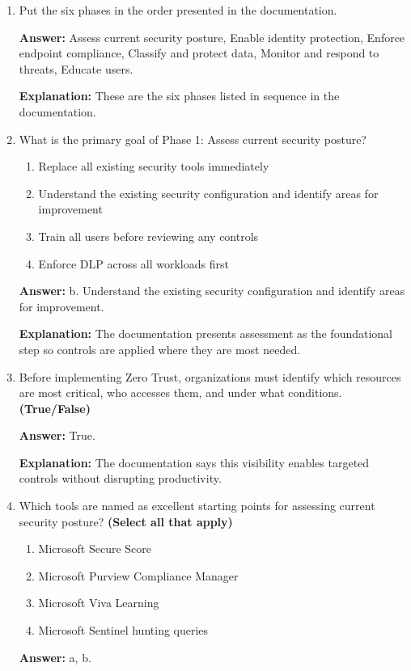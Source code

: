 \documentclass[10pt]{article}
\begin{document}
\begin{enumerate}[leftmargin=*]
\textbf{Explanation:} The documentation says organizations should progress through six phases.

\item Put the six phases in the order presented in the documentation.

\textbf{Answer:} Assess current security posture, Enable identity protection, Enforce endpoint compliance, Classify and protect data, Monitor and respond to threats, Educate users.

\textbf{Explanation:} These are the six phases listed in sequence in the documentation.

\item What is the primary goal of Phase 1: Assess current security posture?
\begin{enumerate}[label=\alph*., leftmargin=1.5em]
\item Replace all existing security tools immediately
\item Understand the existing security configuration and identify areas for improvement
\item Train all users before reviewing any controls
\item Enforce DLP across all workloads first
\end{enumerate}
\textbf{Answer:} b. Understand the existing security configuration and identify areas for improvement.

\textbf{Explanation:} The documentation presents assessment as the foundational step so controls are applied where they are most needed.

\item Before implementing Zero Trust, organizations must identify which resources are most critical, who accesses them, and under what conditions. \textbf{(True/False)}

\textbf{Answer:} True.

\textbf{Explanation:} The documentation says this visibility enables targeted controls without disrupting productivity.

\item Which tools are named as excellent starting points for assessing current security posture? \textbf{(Select all that apply)}
\begin{enumerate}[label=\alph*., leftmargin=1.5em]
\item Microsoft Secure Score
\item Microsoft Purview Compliance Manager
\item Microsoft Viva Learning
\item Microsoft Sentinel hunting queries
\end{enumerate}
\textbf{Answer:} a, b.


\end{enumerate}
\end{document}
